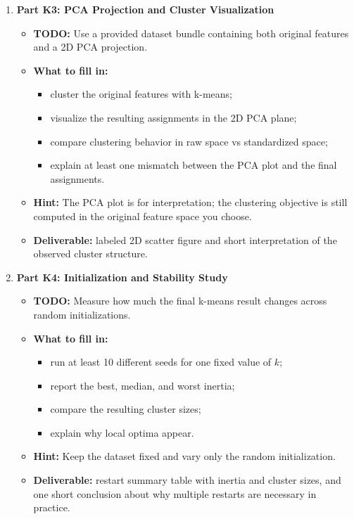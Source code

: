 \begin{enumerate}[label=\textbf{K\arabic*.}]
  \item \textbf{Part K3: PCA Projection and Cluster Visualization}
  \begin{itemize}
    \item \textbf{TODO:} Use a provided dataset bundle containing both original features and a 2D PCA projection.
    \item \textbf{What to fill in:}
    \begin{itemize}
      \item cluster the original features with k-means;
      \item visualize the resulting assignments in the 2D PCA plane;
      \item compare clustering behavior in raw space vs standardized space;
      \item explain at least one mismatch between the PCA plot and the final assignments.
    \end{itemize}
    \item \textbf{Hint:} The PCA plot is for interpretation; the clustering objective is still computed in the original feature space you choose.
    \item \textbf{Deliverable:} labeled 2D scatter figure and short interpretation of the observed cluster structure.
  \end{itemize}

  \item \textbf{Part K4: Initialization and Stability Study}
  \begin{itemize}
    \item \textbf{TODO:} Measure how much the final k-means result changes across random initializations.
    \item \textbf{What to fill in:}
    \begin{itemize}
      \item run at least 10 different seeds for one fixed value of $k$;
      \item report the best, median, and worst inertia;
      \item compare the resulting cluster sizes;
      \item explain why local optima appear.
    \end{itemize}
    \item \textbf{Hint:} Keep the dataset fixed and vary only the random initialization.
    \item \textbf{Deliverable:} restart summary table with inertia and cluster sizes, and one short conclusion about why multiple restarts are necessary in practice.
  \end{itemize}


\end{enumerate}
